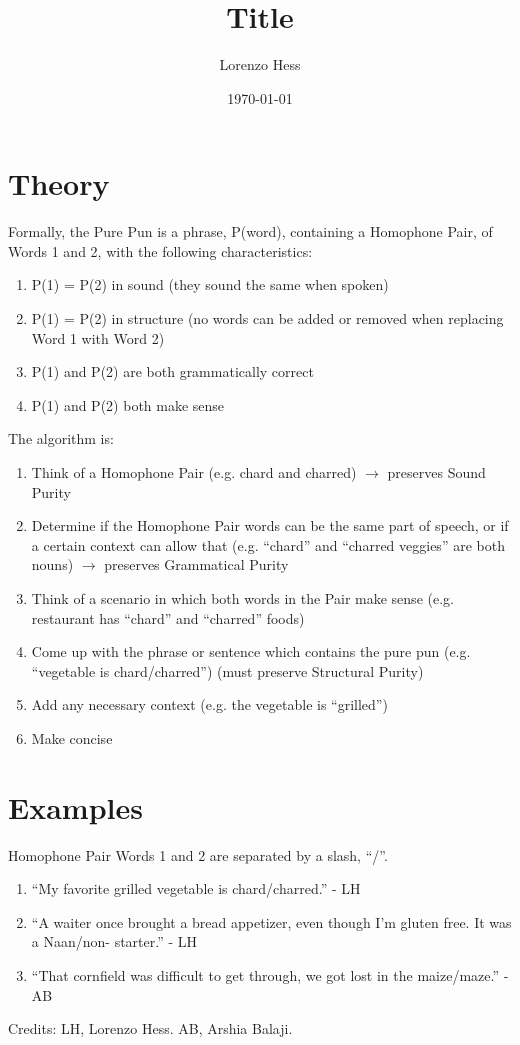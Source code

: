 \documentclass[12pt]{article}
\author{Lorenzo Hess}
\date{\today}
\title{Title}
\begin{document}
\section{Theory}%

Formally, the Pure Pun is a phrase, P(word), containing a Homophone Pair, of Words 1 and 2, with the following characteristics:
\begin{enumerate}
  \item P(1) = P(2) in sound (they sound the same when spoken)
  \item P(1) = P(2) in structure (no words can be added or removed when replacing Word 1 with Word 2)
  \item P(1) and P(2) are both grammatically correct
  \item P(1) and P(2) both make sense\\
\end{enumerate}

\noindent The algorithm is:
\begin{enumerate}
  \item Think of a Homophone Pair (e.g. chard and charred) $\to$ preserves Sound Purity
  \item Determine if the Homophone Pair words can be the same part of speech, or if a certain context can allow that (e.g. ``chard'' and ``charred veggies'' are both nouns) $\to$ preserves Grammatical Purity
  \item Think of a scenario in which both words in the Pair make sense (e.g. restaurant has ``chard'' and ``charred'' foods)
  \item Come up with the phrase or sentence which contains the pure pun (e.g. ``vegetable is chard/charred'') (must preserve Structural Purity)
  \item Add any necessary context (e.g. the vegetable is ``grilled'')
  \item Make concise
\end{enumerate}

\section{Examples}%

Homophone Pair Words 1 and 2 are separated by a slash, ``/''.

\begin{enumerate}
  \item ``My favorite grilled vegetable is chard/charred.'' - LH
  \item ``A waiter once brought a bread appetizer, even though I'm gluten free. It was a Naan/non- starter.'' - LH
  \item ``That cornfield was difficult to get through, we got lost in the maize/maze.'' - AB
\end{enumerate}

\vfill
Credits: LH, Lorenzo Hess. AB, Arshia Balaji.
\end{document}
